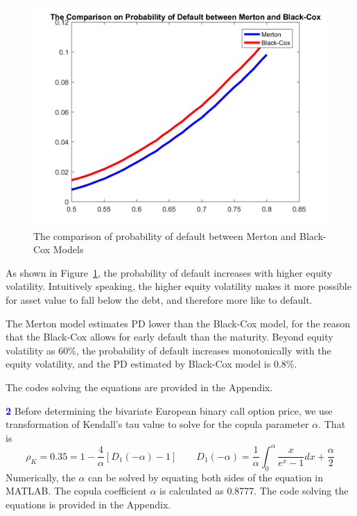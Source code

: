 \documentclass[a4paper,11pt] {article}
\begin{document}
\begin{center}
\begin{figure}
  \centering
  \includegraphics[scale=0.3]{PDs.png}
  \caption{The comparison of probability of default between Merton and Black-Cox Models}\label{fig::PDs}
\end{figure}
\end{center}

As shown in Figure~\ref{fig::PDs}, the probability of default increases with higher equity volatility. Intuitively speaking, the higher equity volatility makes it more possible for asset value to fall below the debt, and therefore more like to default.

The Merton model estimates PD lower than the Black-Cox model, for the reason that the Black-Cox allows for early default than the maturity. Beyond equity volatility as 60\%, the probability of default increases monotonically with the equity volatility, and the PD estimated by Black-Cox model is 0.8\%.

The codes solving the equations are provided in the Appendix.

\bigskip

\textcolor{blue}{\bf 2} Before determining the bivariate European binary call option price, we use transformation of Kendall's tau value to solve for the copula parameter $\alpha$. That is
$$
\rho_K = 0.35 = 1-\frac{4}{\alpha}[D_1(-\alpha)-1] \qquad D_1(-\alpha) = \frac{1}{\alpha} \int_0^\alpha \frac{x}{e^x-1}dx + \frac{\alpha}{2}
$$
Numerically, the $\alpha$ can be solved by equating both sides of the equation in MATLAB. The copula coefficient $\alpha$ is calculated as 0.8777.  The code solving the equations is provided in the Appendix.
\end{document}
